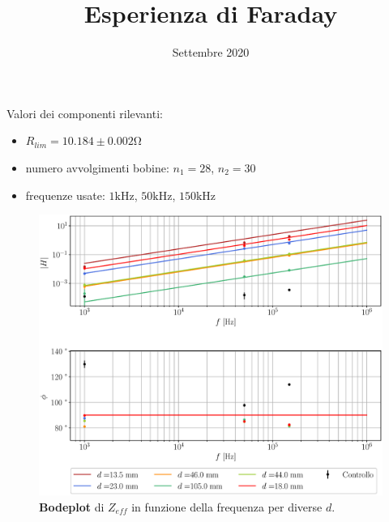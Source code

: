 \documentclass[../../presentazione_orale.tex]{subfiles}
\title{Esperienza di Faraday}
\date{Settembre 2020}}
\begin{document}
\onlyinsubfile{\maketitle}

Valori dei componenti rilevanti:
\begin{itemize}
    \item $R_{lim} = 10.184\pm0.002 \si{\ohm}$
    \item numero avvolgimenti bobine: $n_1 = 28$, $n_2 = 30$
    \item frequenze usate: $1\si{\kilo\hertz}$, $50\si{\kilo\hertz}$, $150\si{\kilo\hertz}$
\end{itemize}

\begin{figure}[h!]
    \centering
    \includegraphics[scale = 0.55]{Grafici/bode.eps}
    \caption{\textbf{Bodeplot} di $Z_{eff}$ in funzione della frequenza per diverse $d$.}
    \label{fig:bode}
\end{figure}
\end{document}
